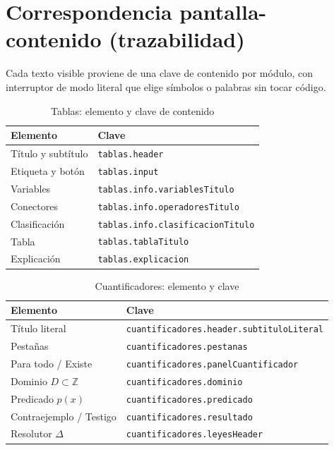 \documentclass[11pt,a4paper,openany]{book}
\begin{document}
\chapter{Correspondencia pantalla-contenido (trazabilidad)}
\label{ch:trazabilidad}
Cada texto visible proviene de una clave de contenido por m\'odulo, con interruptor de modo literal que elige s\'imbolos o palabras sin tocar c\'odigo.
\begin{table}[H]
\centering
\caption{Tablas: elemento y clave de contenido}
\begin{tabular}{ll}
\toprule
Elemento & Clave \\
\midrule
T\'itulo y subt\'itulo & \texttt{tablas.header} \\
Etiqueta y bot\'on & \texttt{tablas.input} \\
Variables & \texttt{tablas.info.variablesTitulo} \\
Conectores & \texttt{tablas.info.operadoresTitulo} \\
Clasificaci\'on & \texttt{tablas.info.clasificacionTitulo} \\
Tabla & \texttt{tablas.tablaTitulo} \\
Explicaci\'on & \texttt{tablas.explicacion} \\
\bottomrule
\end{tabular}
\end{table}
\begin{table}[H]
\centering
\caption{Cuantificadores: elemento y clave}
\begin{tabular}{ll}
\toprule
Elemento & Clave \\
\midrule
T\'itulo literal & \texttt{cuantificadores.header.subtituloLiteral} \\
Pesta\~nas & \texttt{cuantificadores.pestanas} \\
Para todo / Existe & \texttt{cuantificadores.panelCuantificador} \\
Dominio $D \subset \mathbb{Z}$ & \texttt{cuantificadores.dominio} \\
Predicado $p(x)$ & \texttt{cuantificadores.predicado} \\
Contraejemplo / Testigo & \texttt{cuantificadores.resultado} \\
Resolutor $\Delta$ & \texttt{cuantificadores.leyesHeader} \\
\bottomrule
\end{tabular}
\end{table}
\end{document}
